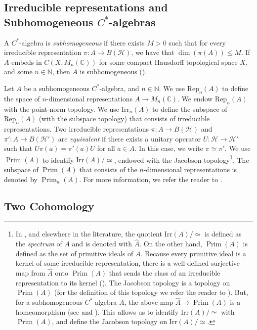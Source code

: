 \documentclass{amsart}
\newcommand{\Rep}{\mathrm{Rep}}
\theoremstyle{definition}
\newcommand{\C}{\mathbb{C}}
\newcommand{\N}{\mathbb{N}}
\DeclareMathOperator{\Prim}{Prim}
\newcommand{\mc}{\mathcal}
\newcommand{\Irr}{\mathrm{Irr}}
\begin{document}
\subsection{Irreducible representations and Subhomogeneous $C^*$-algebras} \par
A $C^*$-algebra is \emph{subhomogeneous} if there exists $M>0$ such that for every irreducible representation $\pi:A \to B(\mc{H})$, we have that $\dim(\pi(A))\leq M$. If $A$ embeds in $C(X,M_n(\C))$ for some compact Hausdorff topological space $X$, and some $n\in \N$, then $A$ is subhomogeneous (\cite[IV. 1.4.4]{Bla10}). \par
Let $A$ be a subhomogeneous $C^*$-algebra, and $n\in \N$. We use $\Rep_n(A)$ to define the space of $n$-dimensional representations $A\to M_n(\C)$. We endow $\Rep_n(A)$ with the point-norm topology. We use $\Irr_n(A)$ to define the subspace of $\Rep_n(A)$ (with the subspace topology) that consists of irreducible representations. Two irreducible representations $\pi \colon A\to B(\mc{H})$ and $\pi'\colon A\rightarrow B(\mc{H}')$ are \emph{equivalent} if there exists a unitary operator $U \colon \mc{H}\to \mc{H}'$ such that $U\pi(a)=\pi'(a)U$ for all $a\in A$. In this case, we write $\pi\simeq \pi'$. We use $\Prim(A)$ to identify $\Irr(A)/\simeq$, endowed with the Jacobson topology\footnote{In \cite{Dix77}, and elsewhere in the literature, the quotient $\Irr(A)/\simeq$ is defined as the \emph{spectrum} of $A$ and is denoted with $\widehat{A}$. On the other hand, $\Prim(A)$ is defined as the set of primitive ideals of $A$. Because every primitive ideal is a kernel of some irreducible representation, there is a well-defined surjective map from $\widehat{A}$ onto $\Prim(A)$ that sends the class of an irreducible representation to its kernel (\cite[3.1.5.]{Dix77}). The Jacobson topology is a topology on $\Prim(A)$ (for the definition of this topology we refer the reader to \cite[3.1.]{Dix77}). But, for a subhomogeneous $C^*$-algebra $A$, the above map $\widehat{A}\to \Prim(A)$ is a homeomorphism (see \cite[3.1.6 (p.71)]{Dix77} and \cite[Thm IV.15.7 (p.339)]{Bla10}). This allows us to identify $\Irr(A)/\simeq$ with $\Prim(A)$, and define the Jacobson topology on $\Irr(A)/\simeq$.}. The subspace of $\Prim(A)$ that consists of the $n$-dimensional representations is denoted by $\Prim_n(A)$. For more information, we refer the reader to \cite[Chapter 3]{Dix77}.
\subsection{Two Cohomology}
\end{document}

